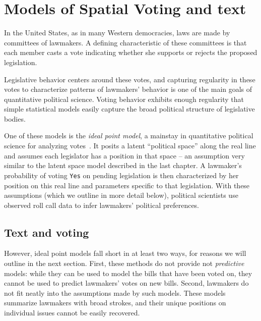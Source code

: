 \chapter{Models of Spatial Voting and text}
\label{chapter:spatial_voting}

In the United States, as in many Western democracies, laws are made by
committees of lawmakers.  A defining characteristic of these
committees is that each member casts a vote indicating whether she
supports or rejects the proposed legislation.

Legislative behavior centers around these votes, and capturing
regularity in these votes to characterize patterns of lawmakers'
behavior is one of the main goals of quantitative political science.
Voting behavior exhibits enough regularity that simple statistical
models easily capture the broad political structure of legislative
bodies.

One of these models is the \emph{ideal point model}, a mainstay in
quantitative political science for analyzing
votes~\cite{clinton:2004}.  It posits a latent ``political space''
along the real line and assumes each legislator has a position in that
space -- an assumption very similar to the latent space model
described in the last chapter.
A lawmaker's probability of voting \verb!Yes! on
pending legislation is then characterized by her position on this real
line and parameters specific to that legislation.  With these
assumptions (which we outline in more detail below), political
scientists use observed roll call data to infer lawmakers' political
preferences.

\section*{Text and voting}
However, ideal point models fall short in at least two ways, for
reasons we will outline in the next section.  First, these methods do
not provide not \emph{predictive} models: while they can be used to
model the bills that have been voted on, they cannot be used to
predict lawmakers' votes on new bills.  Second, lawmakers do not fit
neatly into the assumptions made by such models.  These models
summarize lawmakers with broad strokes, and their unique positions on
individual issues cannot be easily recovered.

